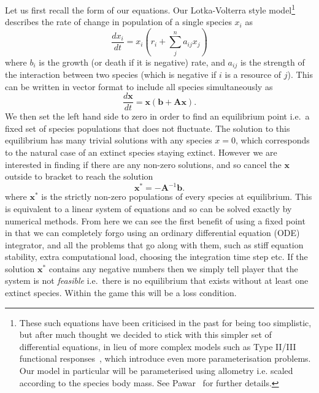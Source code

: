 Let us first recall the form of our equations. Our Lotka-Volterra style model\footnote{These such equations have been criticised in the past for being too simplistic, but after much thought we decided to stick with this simpler set of differential equations, in lieu of more complex models such as Type II/III functional responses~\cite{holling}, which introduce even more parameterisation problems. Our model in particular will be parameterised using allometry i.e. scaled according to the species body mass. See Pawar~\cite{pawar} for further details.}
describes the rate of change in population of a single species $x_i$ as
\begin{equation}
    \frac{dx_i}{dt} = x_i(r_i + \sum_j^na_{ij}x_j)
    \label{lv}
\end{equation}
where $b_i$ is the growth (or death if it is negative) rate, and $a_{ij}$ is the strength of the interaction between two species (which is negative if $i$ is a resource of $j$). 
This can be written in vector format to include all species simultaneously as
\begin{equation}
    \frac{d\mathbf{x}}{dt} = \mathbf{x}(\mathbf{b} + \mathbf{Ax}).
    \label{interaction matrix}
\end{equation}
We then set the left hand side to zero in order to find an equilibrium point i.e.\ a fixed set of species populations that does not fluctuate.
The solution to this equilibrium has many trivial solutions with any species $x=0$, which corresponds to the natural case of an extinct species staying extinct.
However we are interested in finding if there are any non-zero solutions, and so cancel the $\mathbf{x}$ outside to bracket to reach the solution
\begin{equation}
    \mathbf{x^*} = -\mathbf{A}^{-1}\mathbf{b}.
    \label{equilibrium}
\end{equation}
where $\mathbf{x}^*$ is the strictly non-zero populations of every species at equilibrium.
This is equivalent to a linear system of equations and so can be solved exactly by numerical methods.
From here we can see the first benefit of using a fixed point in that we can completely forgo using an ordinary differential equation (ODE) integrator, and all the problems that go along with them, such as stiff equation stability, extra computational load, choosing the integration time step etc.
If the solution $\mathbf{x^*}$ contains any negative numbers then we simply tell player that the system is not \emph{feasible} i.e.\ there is no equilibrium that exists without at least one extinct species. Within the game this will be a loss condition.

